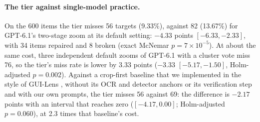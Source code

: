 \paragraph{The tier against single-model practice.} On the 600 items the tier misses 56 targets (9.33\%), against 82 (13.67\%) for GPT-6.1's two-stage zoom at its default setting: $-4.33$ points $[-6.33,-2.33]$, with 34 items repaired and 8 broken (exact McNemar $p=7\times10^{-5}$). At about the same cost, three independent default zooms of GPT-6.1 with a cluster vote miss 76, so the tier's miss rate is lower by 3.33 points ($-3.33$ $[-5.17,-1.50]$, Holm-adjusted $p=0.002$). Against a crop-first baseline that we implemented in the style of GUI-Lens \citep{fu2026guilens}, without its OCR and detector anchors or its verification step and with our own prompts, the tier misses 56 against 69: the difference is $-2.17$ points with an interval that reaches zero ($[-4.17,0.00]$; Holm-adjusted $p=0.060$), at 2.3 times that baseline's cost.

